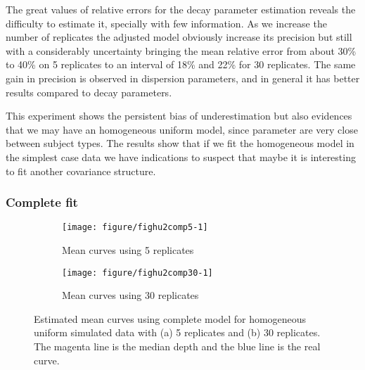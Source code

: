 The great values of relative errors for the decay parameter estimation reveals the difficulty to estimate it, specially with few information. As we increase the number of replicates the adjusted model obviously increase its precision but still with a considerably uncertainty bringing the mean relative error from about 30\% to 40\% on 5 replicates to an interval of 18\% and 22\% for 30 replicates. The same gain in precision is observed in dispersion parameters, and in general it has better results compared to decay parameters.

This experiment shows the persistent bias of underestimation but also evidences that we may have an homogeneous uniform model, since parameter are very close between subject types. The results show that if we fit the homogeneous model in the simplest case data we have indications to suspect that maybe it is interesting to fit another  covariance structure.





\subsubsection{Complete fit}
\label{sec:hu2comp}





\begin{figure}[!t]
  \centering
  \begin{subfigure}{\textwidth}
    \centering
\begin{knitrout}
\color{fgcolor}
\texttt{[image: figure/fighu2comp5-1]} 

\end{knitrout}
    \caption{Mean curves using 5 replicates}
  \end{subfigure}
  \begin{subfigure}{\textwidth}
    \centering
\begin{knitrout}
\color{fgcolor}
\texttt{[image: figure/fighu2comp30-1]} 

\end{knitrout}
    \caption{Mean curves using 30 replicates}
  \end{subfigure}
  \caption{Estimated mean curves using complete model for homogeneous uniform simulated data with (a) 5 replicates and (b) 30 replicates. The magenta line is the median depth and the blue line is the real curve.}
  \label{fig:mpchu2comp}
\end{figure}


